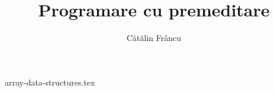 \documentclass[12pt,openany]{book}
\title{Programare cu premeditare}
\author{Cătălin Frâncu}
\date{}
\begin{document}

\hypersetup{pageanchor=false}

\begin{titlepage}
\maketitle
\end{titlepage}

\hypersetup{pageanchor=true}
\cleardoublepage
\mainmatter

\raggedbottom

\begingroup
\hypersetup{hidelinks} %
\tableofcontents
\endgroup

\cleardoublepage

{array-data-structures.tex}
\end{document}
